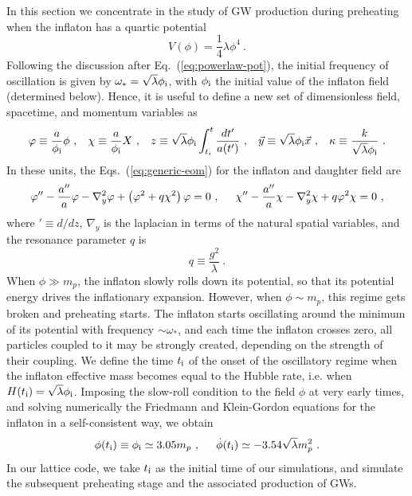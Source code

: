 \documentclass[a4paper,11pt]{article}
\newcommand{\be}{\begin{equation}}
\newcommand{\ee}{\end{equation}}
\newcommand{\bea}{\begin{eqnarray}}
\newcommand{\eea}{\end{eqnarray}}
\begin{document}
In this section we concentrate in the study of GW production during preheating when the inflaton has a quartic potential
\be V (\phi) = \frac{1}{4} \lambda \phi^4 \ .\ee
Following the discussion after Eq.~(\ref{eq:powerlaw-pot}), the initial frequency of oscillation is given by $\omega_* = \sqrt{\lambda} \phi_{\rm i}$, with $\phi_{\rm i}$ the initial value of the inflaton field (determined below). Hence, it is useful to define a new set of dimensionless field, spacetime, and momentum variables as
\be \varphi \equiv \frac{a}{\phi_{\rm i}} \phi \ , \hspace{0.3cm} \chi \equiv \frac{a}{\phi_{\rm i}} X \ , \hspace{0.3cm} z \equiv \sqrt{\lambda} \phi_{\rm i} \int_{t_i}^t \frac{dt'}{a(t')} \ , \hspace{0.3cm} \vec{y} \equiv \sqrt{\lambda} \phi_{\rm i} \vec{x} \ , \hspace{0.3cm}  \kappa \equiv \frac{k}{\sqrt{\lambda} \phi_{\rm i}}\ . \label{eq:lphi4-variables}\ee
In these units, the Eqs.~(\ref{eq:generic-eom}) for the inflaton and daughter field are
\bea \varphi'' -\frac{a''}{a} \varphi -  \nabla_y^2 \varphi + \left( \varphi^{2} + q \chi^2 \right) \varphi = 0  \ , \hspace{0.5cm} \chi'' -  \frac{a''}{a}\chi - \nabla_y^2 \chi + q \varphi^2 \chi = 0 \ , \label{eq:eom-lame}\eea
where $' \equiv d / dz$, $\nabla_y$ is the laplacian in terms of the natural spatial variables, and the resonance parameter $q$ is
\be q \equiv \frac{g^2}{\lambda} \label{eq:lphi4-qresdef} \ .\ee
When $\phi \gg m_p$, the inflaton slowly rolls down its potential, so that its potential energy drives the inflationary expansion. However, when $\phi \sim m_p$, this regime gets broken and preheating starts. The inflaton starts oscillating around the minimum of its potential with frequency $\sim \omega_*$, and each time the inflaton crosses zero, all particles coupled to it may be strongly created, depending on the strength of their coupling. We define the time $t_{\rm i}$ of the onset of the oscillatory regime when the inflaton effective mass becomes equal to the Hubble rate, i.e. when $H (t_{\rm i}) = \sqrt{\lambda} \phi_{\rm i}$.  Imposing the slow-roll condition to the field $\phi$ at very early times, and solving numerically the Friedmann and Klein-Gordon equations for the inflaton in a self-consistent way, we obtain \be\phi (t_{\rm i} ) \equiv \phi_{\rm i} \simeq 3.05 m_p \ , \hspace{0.5cm} \dot{\phi} (t_{\rm i} ) \simeq -3.54 \sqrt{\lambda} m_p^2 \ . \ee 
In our lattice code, we take $t_{\rm i}$ as the initial time of our simulations, and simulate the subsequent preheating stage and the associated production of GWs. 
\end{document}
